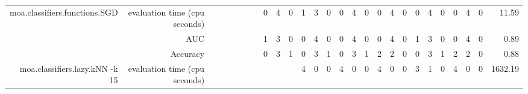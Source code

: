 \documentclass{article}
\providecommand{\tabularnewline}{\\}
\begin{document}
\begin{sidewaystable}
\begin{tabular}{|r|r|rrrrrrrr|r|r|r|r|r|r|r|r|r|r|r|r|r|r|r|r|r|}
 \cline{1-2} \cline{6-27}
\multirow{3}{*}{moa.classifiers.functions.SGD} & evaluation time (cpu seconds) & \multicolumn{1}{r}{} & \multicolumn{1}{r}{} & \multicolumn{1}{r}{} & \multicolumn{1}{r}{} & \multicolumn{1}{r}{} & \multicolumn{1}{r|}{} & \multicolumn{1}{r|}{0} & \multicolumn{1}{r|}{4} & \multicolumn{1}{r|}{0} & \multicolumn{1}{r|}{1} & \multicolumn{1}{r|}{3} & \multicolumn{1}{r|}{0} & \multicolumn{1}{r|}{0} & \multicolumn{1}{r|}{4} & \multicolumn{1}{r|}{0} & \multicolumn{1}{r|}{0} & \multicolumn{1}{r|}{4} & \multicolumn{1}{r|}{0} & \multicolumn{1}{r|}{0} & \multicolumn{1}{r|}{4} & \multicolumn{1}{r|}{0} & \multicolumn{1}{r|}{0} & \multicolumn{1}{r|}{4} & \multicolumn{1}{r|}{0} & 11.59\tabularnewline
 \cline{2-2} \cline{9-27}
 & AUC & \multicolumn{1}{r}{} & \multicolumn{1}{r}{} & \multicolumn{1}{r}{} & \multicolumn{1}{r}{} & \multicolumn{1}{r}{} & \multicolumn{1}{r|}{} & \multicolumn{1}{r|}{1} & \multicolumn{1}{r|}{3} & \multicolumn{1}{r|}{0} & \multicolumn{1}{r|}{0} & \multicolumn{1}{r|}{4} & \multicolumn{1}{r|}{0} & \multicolumn{1}{r|}{0} & \multicolumn{1}{r|}{4} & \multicolumn{1}{r|}{0} & \multicolumn{1}{r|}{0} & \multicolumn{1}{r|}{4} & \multicolumn{1}{r|}{0} & \multicolumn{1}{r|}{1} & \multicolumn{1}{r|}{3} & \multicolumn{1}{r|}{0} & \multicolumn{1}{r|}{0} & \multicolumn{1}{r|}{4} & \multicolumn{1}{r|}{0} & 0.89\tabularnewline
 \cline{2-2} \cline{9-27}
 & Accuracy & \multicolumn{1}{r}{} & \multicolumn{1}{r}{} & \multicolumn{1}{r}{} & \multicolumn{1}{r}{} & \multicolumn{1}{r}{} & \multicolumn{1}{r|}{} & \multicolumn{1}{r|}{0} & \multicolumn{1}{r|}{3} & \multicolumn{1}{r|}{1} & \multicolumn{1}{r|}{0} & \multicolumn{1}{r|}{3} & \multicolumn{1}{r|}{1} & \multicolumn{1}{r|}{0} & \multicolumn{1}{r|}{3} & \multicolumn{1}{r|}{1} & \multicolumn{1}{r|}{2} & \multicolumn{1}{r|}{2} & \multicolumn{1}{r|}{0} & \multicolumn{1}{r|}{0} & \multicolumn{1}{r|}{3} & \multicolumn{1}{r|}{1} & \multicolumn{1}{r|}{2} & \multicolumn{1}{r|}{2} & \multicolumn{1}{r|}{0} & 0.88\tabularnewline
 \cline{1-2} \cline{9-27}
\multirow{3}{*}{moa.classifiers.lazy.kNN -k 15} & evaluation time (cpu seconds) & \multicolumn{1}{r}{} & \multicolumn{1}{r}{} & \multicolumn{1}{r}{} & \multicolumn{1}{r}{} & \multicolumn{1}{r}{} & \multicolumn{1}{r}{} & \multicolumn{1}{r}{} & \multicolumn{1}{r}{} & \multicolumn{1}{r|}{} & \multicolumn{1}{r|}{4} & \multicolumn{1}{r|}{0} & \multicolumn{1}{r|}{0} & \multicolumn{1}{r|}{4} & \multicolumn{1}{r|}{0} & \multicolumn{1}{r|}{0} & \multicolumn{1}{r|}{4} & \multicolumn{1}{r|}{0} & \multicolumn{1}{r|}{0} & \multicolumn{1}{r|}{3} & \multicolumn{1}{r|}{1} & \multicolumn{1}{r|}{0} & \multicolumn{1}{r|}{4} & \multicolumn{1}{r|}{0} & \multicolumn{1}{r|}{0} & 1632.19\tabularnewline

\end{tabular}
\end{sidewaystable}
\end{document}
